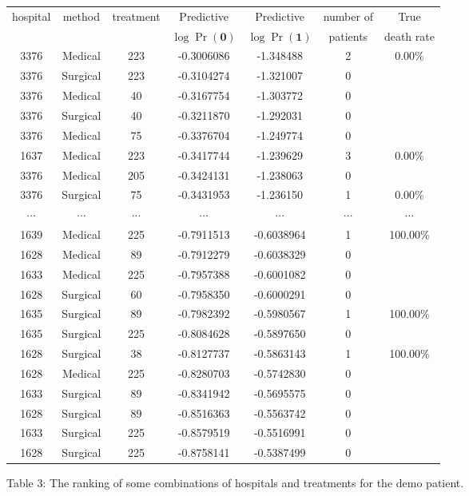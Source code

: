 \documentclass{article}
\begin{document}
\begin{center} 
    \begin{tabular}{|c|c|c|c|c|c|c|} 
       \hline 
hospital & method & treatment & Predictive& Predictive & number of & True\\
  &  &   &$\log \Pr(\textbf{0})$ & $\log \Pr(\textbf{1})$ & patients & death rate\\
\hline
 3376&  Medical&   223  & -0.3006086&-1.348488  & 2 & 0.00\%\\
\hline
 3376&  Surgical&  223  & -0.3104274&-1.321007  & 0  &\\
\hline
3376&  Medical&  40  & -0.3167754&-1.303772  & 0  &\\
\hline
3376&  Surgical&  40 & -0.3211870&-1.292031  & 0  &\\
\hline
3376&  Medical&  75 & -0.3376704&-1.249774  & 0  &\\
\hline
1637&  Medical&  223 & -0.3417744&-1.239629 & 3 & 0.00\%\\
\hline
  3376&  Medical &      205   &-0.3424131& -1.238063  &       0  &  \\
\hline
  3376& Surgical &       75     &   -0.3431953& -1.236150 &    1  &  0.00\%\\
\hline
 $\cdots$ & $\cdots$ & $\cdots$ & $\cdots$ & $\cdots$ & $\cdots$ & $\cdots$ \\
\hline
1639&Medical     &  225& -0.7911513 &-0.6038964         &   1          &100.00\%\\
\hline
1628&Medical     &   89 &-0.7912279 &-0.6038329   &         0         &\\
\hline
1633 & Medical   &    225& -0.7957388& -0.6001082   &         0         &\\
\hline
1628& Surgical   &     60 &-0.7958350 &-0.6000291     &       0         &\\
\hline
1635& Surgical   &     89 &-0.7982392& -0.5980567      &      1        &100.00\%\\
\hline
1635& Surgical   &    225& -0.8084628& -0.5897650       &     0         &\\
\hline
1628& Surgical    &    38 &-0.8127737 &-0.5863143   &         1         &100.00\%\\
\hline
1628&  Medical     &  225& -0.8280703& -0.5742830    &        0         &\\
\hline
1633& Surgical   &     89 &-0.8341942& -0.5695575       &     0         &\\
\hline
1628& Surgical  &      89 &-0.8516363 &-0.5563742          &  0         &\\
\hline
1633& Surgical   &    225& -0.8579519& -0.5516991        &    0         &\\
\hline
1628& Surgical  &     225& -0.8758141 &-0.5387499         &   0         &\\
\hline
    \end{tabular} 
\end{center}
\centerline
{Table 3: The ranking of some combinations of hospitals and treatments for the demo patient.}
\end{document}

